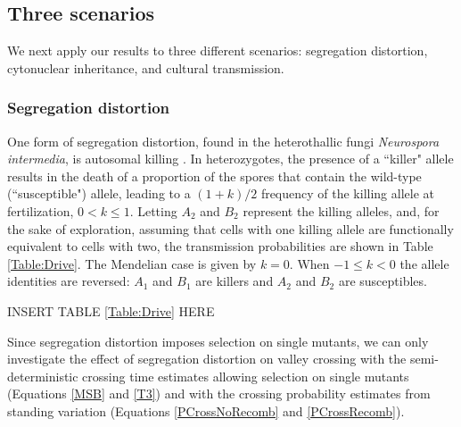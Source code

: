 \documentclass[review,3p,authoryear]{elsarticle}
\begin{document}

\subsection{Three scenarios}
We next apply our results to three different scenarios: segregation distortion, cytonuclear inheritance, and cultural transmission.

\subsubsection{Segregation distortion}
One form of segregation distortion, found in the heterothallic fungi \textit{Neurospora intermedia}, is autosomal killing \citep{Burt2006}.
In heterozygotes, the presence of a ``killer" allele results in the death of a proportion of the spores that contain the wild-type (``susceptible") allele, leading to a $(1+k)/2$ frequency of the killing allele at fertilization, $0<k\leq1$.   
Letting $A_2$ and $B_2$ represent the killing alleles, and, for the sake of exploration, assuming that cells with one killing allele are functionally equivalent to cells with two, the transmission probabilities are shown in Table \ref{Table:Drive}.
The Mendelian case is given by $k=0$.
When $-1\leq k<0$ the allele identities are reversed: $A_1$ and $B_1$ are killers and $A_2$ and $B_2$ are susceptibles.

INSERT TABLE \ref{Table:Drive} HERE

Since segregation distortion imposes selection on single mutants, we can only investigate the effect of segregation distortion on valley crossing with 
the semi-deterministic crossing time estimates allowing selection on single mutants (Equations \ref{MSB} and \ref{T3}) and with the crossing probability estimates from standing variation (Equations \ref{PCrossNoRecomb} and \ref{PCrossRecomb}).
\end{document}
